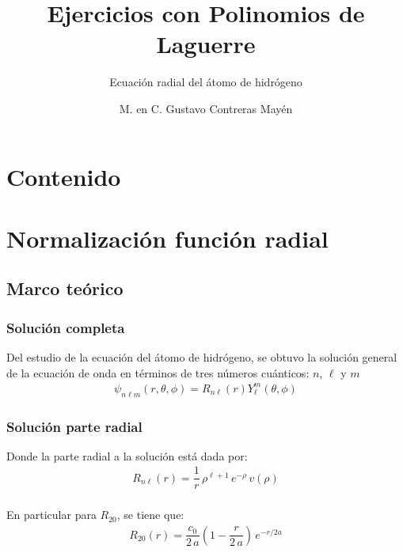 
\title{\large{Ejercicios con Polinomios de Laguerre}}
\subtitle{Ecuación radial del átomo de hidrógeno}
\author{M. en C. Gustavo Contreras Mayén}
\date{}

\maketitle
\fontsize{14}{14}\selectfont
{}
\section*{Contenido}
\section{Normalización función radial}
\subsection{Marco teórico}
\begin{frame}
\frametitle{Solución completa}
Del estudio de la ecuación del átomo de hidrógeno, se obtuvo la solución general de la ecuación de onda en términos de tres números cuánticos: $n$, $\ell$ y $m$
\begin{align*}
\psi_{n \ell m} (r, \theta, \phi) =  R_{n \ell} (r) Y_{\ell}^{m} (\theta, \phi)
\end{align*}
\end{frame}
\begin{frame}
\frametitle{Solución parte radial}
Donde la parte radial a la solución está dada por:
\begin{align*}
R_{n \ell}(r) = \dfrac{1}{r} \, \rho^{\ell + 1} \, e^{-\rho} \, v(\rho)
\end{align*}
\\
\bigskip
\pause
En particular para $R_{20}$, se tiene que:
\begin{align*}
R_{20}(r) = \dfrac{c_{0}}{2 \, a} \left( 1 - \dfrac{r}{2 \, a} \right) \, e^{-r/2a}
\end{align*}
\end{frame}
